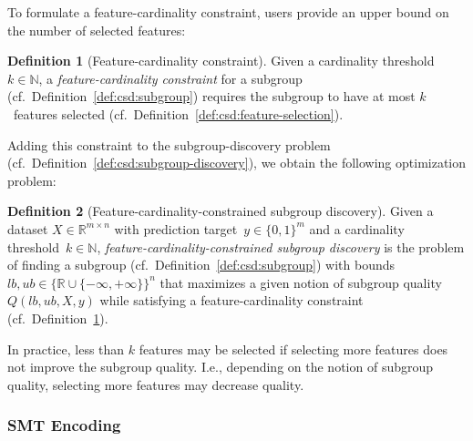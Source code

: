 \documentclass{article}
\theoremstyle{definition}
\newtheorem{definition}{Definition}
\begin{document}
To formulate a feature-cardinality constraint, users provide an upper bound on the number of selected features:
%
\begin{definition}[Feature-cardinality constraint]
	Given a cardinality threshold $k \in \mathbb{N}$,
	a \emph{feature-cardinality constraint} for a subgroup (cf.~Definition~\ref{def:csd:subgroup}) requires the subgroup to have at most $k$~features selected (cf.~Definition~\ref{def:csd:feature-selection}).
	\label{def:csd:feature-cardinality-constraint}
\end{definition}
%
Adding this constraint to the subgroup-discovery problem (cf.~Definition~\ref{def:csd:subgroup-discovery}), we obtain the following optimization problem:
%
\begin{definition}[Feature-cardinality-constrained subgroup discovery]
	Given a dataset $X \in \mathbb{R}^{m \times n}$ with prediction target~$y \in \{0, 1\}^m$
	and a cardinality threshold~$k \in \mathbb{N}$,
	\emph{feature-cardinality-constrained subgroup discovery} is the problem of finding a subgroup (cf.~Definition~\ref{def:csd:subgroup}) with bounds~$\mathit{lb}, \mathit{ub} \in \{\mathbb{R} \cup \{-\infty, +\infty\}\}^n$ that maximizes a given notion of subgroup quality~$Q(\mathit{lb}, \mathit{ub}, X, y)$ while satisfying a feature-cardinality constraint (cf.~Definition~\ref{def:csd:feature-cardinality-constraint}).
	\label{def:csd:feature-cardinality-constrained-subgroup-discovery}
\end{definition}
%
In practice, less than $k$ features may be selected if selecting more features does not improve the subgroup quality.
I.e., depending on the notion of subgroup quality, selecting more features may decrease quality.

\subsubsection{SMT Encoding}
\label{sec:csd:approach:cardinality:smt}
\end{document}
